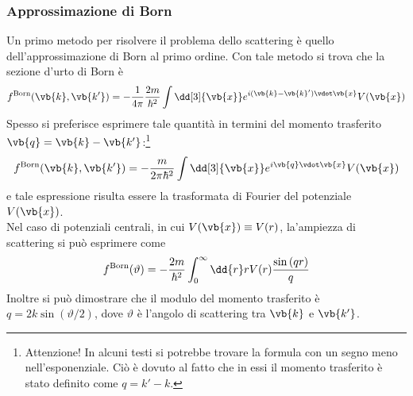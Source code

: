 \subsubsection*{Approssimazione di Born}
Un primo metodo per risolvere il problema dello scattering è quello dell'approssimazione di Born al primo ordine. Con tale metodo si trova che la sezione d'urto di Born è
\begin{equation*}
   f^{\rm Born}(\vb{k}, \vb{k'})
   =-\frac{1}{4 \pi} \frac{2 m}{\hbar^2} \int \dd[3]{\vb{x}} e^{i (\vb{k} - \vb{k}') \vdot \vb{x}} V(\vb{x})
\end{equation*}
Spesso si preferisce esprimere tale quantità in termini del momento trasferito $\vb{q}=\vb{k} - \vb{k'}$:\footnote{Attenzione! In alcuni testi si potrebbe trovare la formula con un segno meno nell'esponenziale. Ciò è dovuto al fatto che in essi il momento trasferito è stato definito come $q=k'-k$.}
\begin{equation*}
   f^{\rm Born}(\vb{k}, \vb{k'})
   =-\frac{m}{2 \pi \hbar^2} \int \dd[3]{\vb{x}} e^{i \vb{q} \vdot \vb{x}} V(\vb{x})
\end{equation*}
e tale espressione risulta essere la trasformata di Fourier del potenziale $V(\vb{x})$.\\
Nel caso di potenziali centrali, in cui $V(\vb{x}) \equiv V(r)$, la'ampiezza di scattering si può esprimere come
\begin{equation*}
   f^{\rm Born}(\vartheta)
   =-\frac{2m}{\hbar^2} \int_{0}^{\infty} \dd{r} r V(r) \frac{\sin{(qr)}}{q}
\end{equation*}
Inoltre si può dimostrare che il modulo del momento trasferito è $q=2k \sin(\vartheta/2)$, dove $\vartheta$ è l'angolo di scattering tra $\vb{k}$ e $\vb{k'}$.
